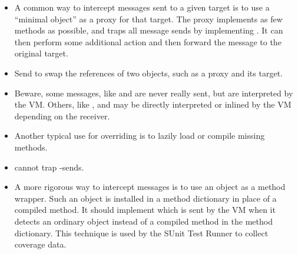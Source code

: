 \documentclass[a4paper,10pt,twoside]{book}
\begin{document}
\begin{itemize}
\item A common way to intercept messages sent to a given target is to use a ``minimal object'' as a proxy for that target. The proxy implements as few methods as possible, and traps all message sends by implementing . It can then perform some additional action and then forward the message to the original target.
\item Send  to swap the references of two objects, such as a proxy and its target.
\item Beware, some messages, like  and  are never really sent, but are interpreted by the VM.  Others, like \ct{+}, \ct{-} and  may be directly interpreted or inlined by the VM depending on the receiver.
\item Another typical use for overriding  is to lazily load or compile missing methods.
\item {} cannot trap \self-sends.
\item A more rigorous way to intercept messages is to use an object as a method wrapper. Such an object is installed in a method dictionary in place of a compiled method. It should implement  which is sent by the VM when it detects an ordinary object instead of a compiled method in the method dictionary. This technique is used by the SUnit Test Runner to collect coverage data.
\end{itemize}

\ifx\wholebook\relax\else
   
   
\end{document}
